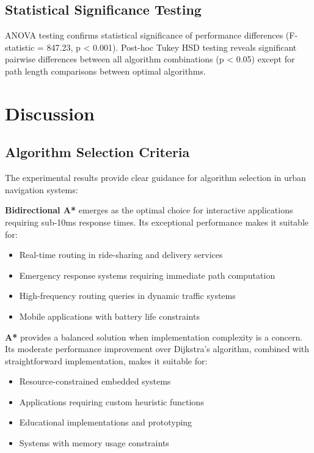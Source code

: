 \documentclass[conference]{IEEEtran}
\begin{document}
\subsection{Statistical Significance Testing}

ANOVA testing confirms statistical significance of performance differences (F-statistic = 847.23, p < 0.001). Post-hoc Tukey HSD testing reveals significant pairwise differences between all algorithm combinations (p < 0.05) except for path length comparisons between optimal algorithms.

\section{Discussion}

\subsection{Algorithm Selection Criteria}

The experimental results provide clear guidance for algorithm selection in urban navigation systems:

\textbf{Bidirectional A*} emerges as the optimal choice for interactive applications requiring sub-10ms response times. Its exceptional performance makes it suitable for:
\begin{itemize}
\item Real-time routing in ride-sharing and delivery services
\item Emergency response systems requiring immediate path computation
\item High-frequency routing queries in dynamic traffic systems
\item Mobile applications with battery life constraints
\end{itemize}

\textbf{A*} provides a balanced solution when implementation complexity is a concern. Its moderate performance improvement over Dijkstra's algorithm, combined with straightforward implementation, makes it suitable for:
\begin{itemize}
\item Resource-constrained embedded systems
\item Applications requiring custom heuristic functions
\item Educational implementations and prototyping
\item Systems with memory usage constraints
\end{itemize}
\end{document}
